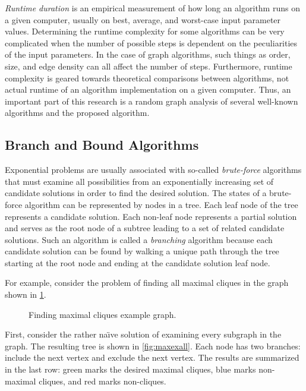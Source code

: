 \emph{Runtime duration} is an empirical measurement of how long an algorithm runs on a given computer, usually on
best, average, and worst-case input parameter values.  Determining the runtime complexity for some algorithms can
be very complicated when the number of possible steps is dependent on the peculiarities of the input parameters.
In the case of graph algorithms, such things as order, size, and edge density can all affect the number of steps.
Furthermore, runtime complexity is geared towards theoretical comparisons between algorithms, not actual runtime of
an algorithm implementation on a given computer.  Thus, an important part of this research is a random graph
analysis of several well-known algorithms and the proposed algorithm.

\subsection{Branch and Bound Algorithms}\label{sec:sub:bandb}

Exponential problems are usually associated with so-called \emph{brute-force} algorithms that must examine all
possibilities from an exponentially increasing set of candidate solutions in order to find the desired solution.
The states of a brute-force algorithm can be represented by nodes in a tree.  Each leaf node of the tree represents
a candidate solution.  Each non-leaf node represents a partial solution and serves as the root node of a subtree
leading to a set of related candidate solutions.  Such an algorithm is called a \emph{branching} algorithm because
each candidate solution can be found by walking a unique path through the tree starting at the root node and ending
at the candidate solution leaf node.

For example, consider the problem of finding all maximal cliques in the graph shown in
\figurename\ref{fig:maxexample}.

\begin{figure}[H]
  \centering
  \caption{Finding maximal cliques example graph.}
  \label{fig:maxexample}
\end{figure}

First, consider the rather na\"{\i}ve solution of examining every subgraph in the graph.  The resulting tree is
shown in \figurename\ref{fig:maxexall}.  Each node has two branches: include the next vertex and exclude the next
vertex.  The results are summarized in the last row: green marks the desired maximal cliques, blue marks
non-maximal cliques, and red marks non-cliques.

